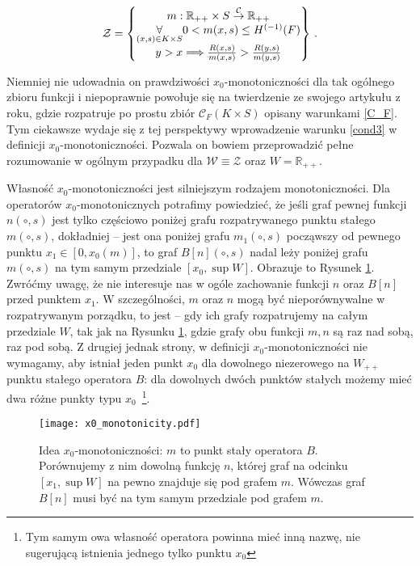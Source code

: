 \begin{equation*}
\mathcal{Z}= \left \{ \begin{matrix}
m: \mathbb{R}_{++} \times S \overset{\mathcal{C}}{\rightarrow} \mathbb{R}_{++} \cr
 \underset{(x,s)\in K\times S}{\forall} 0 < m(x,s) \leq H^{(-1)}(F) \cr
 y > x \Longrightarrow \frac{R(x,s)}{m(x,s)}>\frac{R(y,s)}{m(y,s)}\cr 
\end{matrix} \right \}\,.
\end{equation*}

 Niemniej nie udowadnia on prawdziwości $x_0$-monotoniczności dla tak ogólnego zbioru funkcji i niepoprawnie powołuje się na twierdzenie ze swojego artykułu z \citeyear{Coleman1} roku, gdzie rozpatruje po prostu zbiór $\mathcal{C}_F (K\times S)$ opisany warunkami \ref{C_F}. Tym ciekawsze wydaje się z tej perspektywy wprowadzenie warunku \ref{cond3} w definicji $x_0$-monotoniczności. Pozwala on bowiem przeprowadzić pełne rozumowanie w ogólnym przypadku dla $\mathcal{W} \equiv \mathcal{Z}$ oraz $W = \mathbb{R}_{++}$.

Własność $x_0$-monotoniczności jest silniejszym rodzajem monotoniczności. Dla operatorów $x_0$-monotonicznych potrafimy powiedzieć, że jeśli graf pewnej funkcji $n(\circ, s)$ jest tylko częściowo poniżej grafu rozpatrywanego punktu stałego $m(\circ, s)$, dokładniej -- jest ona poniżej grafu $m_1(\circ, s)$ począwszy od pewnego punktu $x_1 \in [0, x_0 (m)]$, to graf $B[n](\circ, s)$ nadal leży poniżej grafu $m(\circ, s)$ na tym samym przedziale $[x_0, \sup W]$. Obrazuje to Rysunek \ref{rys4}. Zwróćmy uwagę, że nie interesuje nas w ogóle zachowanie funkcji $n$ oraz $B[n]$ przed punktem $x_1$. W szczególności, $m$ oraz $n$ mogą być nieporównywalne w rozpatrywanym porządku, to jest -- gdy ich grafy rozpatrujemy na całym przedziale $W$, tak jak na Rysunku \ref{rys4}, gdzie grafy obu funkcji $m, n$ są raz nad sobą, raz pod sobą. Z drugiej jednak strony, w definicji $x_0$-monotoniczności nie wymagamy, aby istniał jeden punkt $x_0$ dla dowolnego niezerowego na $W_{++}$ punktu stałego operatora $B$: dla dowolnych dwóch punktów stałych możemy mieć dwa różne punkty typu $x_0$~\footnote{Tym samym owa własność operatora powinna mieć inną nazwę, nie sugerującą istnienia jednego tylko punktu $x_0$}.

\begin{figure}
	\begin{center}
		\texttt{[image: x0\_monotonicity.pdf]} 
		\caption[Idea $x_0$-monotoniczności]{Idea $x_0$-monotoniczności: $m$ to punkt stały operatora $B$. Porównujemy z nim dowolną funkcję $n$, której graf na odcinku $[x_1, \sup W]$ na pewno znajduje się pod grafem $m$. Wówczas graf $B[n]$ musi być na tym samym przedziale pod grafem $m$. \\ }\label{rys4}
	\end{center}
\end{figure}

